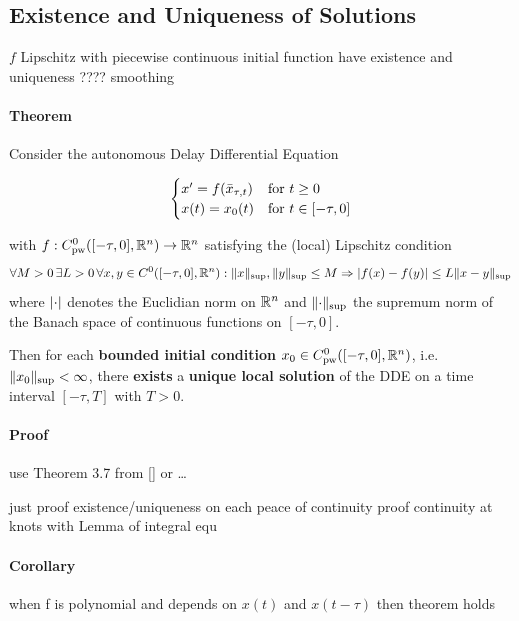 \documentclass[10pt]{article}
\begin{document}
\subsection{Existence and Uniqueness of Solutions}\label{existence-and-uniqueness-of-solutions}

$f$ Lipschitz with piecewise continuous initial function have existence and uniqueness ???? smoothing

\paragraph{Theorem}\label{theorem}
Consider the autonomous Delay Differential Equation



\begin{equation}
    \begin{cases}
        x'=f(\bar{x}_{\tau,t}) & \text{for } t\geq 0\\
        x(t)=x_0(t)     & \text{for } t\in [-\tau,0]
    \end{cases}
\end{equation}

with $f:C^0_\text{pw}([-\tau,0],\mathbb{R}^n)\rightarrow\mathbb{R}^n$ satisfying the (local) Lipschitz condition
\begin{equation}
    \forall M>0\,\exists L>0\,\forall x,y\in C^0([-\tau,0],\mathbb{R}^n) : \lVert x\rVert_{\text{sup}},\lVert y\rVert_{\text{sup}}\leq M\Rightarrow\lvert f(x)-f(y)\rvert \leq L\lVert x-y\rVert_{\text{sup}}
\end{equation}
where $\lvert\cdot\rvert$ denotes the Euclidian norm on $\mathbb{R}^n$ and $\lVert\cdot\rVert_{\text{sup}}$ the supremum norm of the Banach space of continuous functions on $[-\tau,0]$.

Then for each \textbf{bounded initial condition} $x_0\in C^0_\text{pw}([-\tau,0],\mathbb{R}^n)$, i.e.\ $\lVert x_0\rVert_{\text{sup}}< \infty$, there \textbf{exists} a \textbf{unique local solution} of the DDE on a time interval $[-\tau, T]$ with $T>0$.

\paragraph{Proof}\label{proof-1}
use Theorem 3.7 from {[}{]} or \ldots{}

just proof existence/uniqueness on each peace of continuity proof continuity at knots with Lemma of integral equ

\paragraph{Corollary}\label{corollary}
when f is polynomial and depends on $x(t)$ and $x(t-\tau)$ then theorem holds
\end{document}

